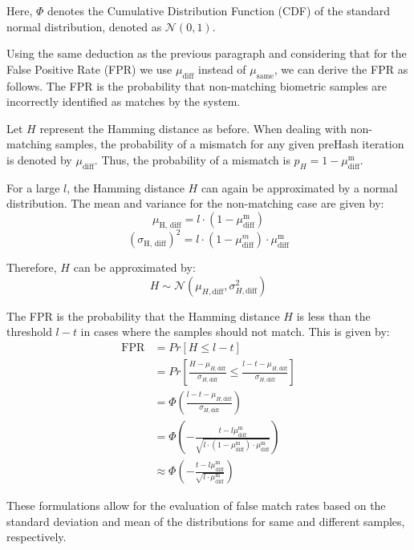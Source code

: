 Here, \(\Phi\) denotes the Cumulative Distribution Function (CDF) of the standard normal distribution, denoted as \(\mathcal{N}(0, 1)\).

Using the same deduction as the previous paragraph and considering that for the False Positive Rate (FPR) we use \(\mu_{\text{diff}}\) instead of \(\mu_{\text{same}}\), we can derive the FPR as follows. The FPR is the probability that non-matching biometric samples are incorrectly identified as matches by the system. 

Let \( H \) represent the Hamming distance as before. When dealing with non-matching samples, the probability of a mismatch for any given preHash iteration is denoted by \( \mu_{\text{diff}} \). Thus, the probability of a mismatch is \( p_H = 1 - \mu_{\text{diff}}^\text{m} \).

For a large \( l \), the Hamming distance \( H \) can again be approximated by a normal distribution. The mean and variance for the non-matching case are given by:
\[
\mu_{\text{H, diff}} = l \cdot (1 - \mu_{\text{diff}}^\text{m})
\]
\[
(\sigma_{\text{H, diff}})^2 = l \cdot (1 - \mu_{\text{diff}}^m) \cdot \mu_{\text{diff}}^\text{m}
\]

Therefore, \( H \) can be approximated by:
\[
H \sim \mathcal{N}(\mu_{H, \text{diff}}, \sigma_{H, \text{diff}}^\text{2})
\]

The FPR is the probability that the Hamming distance \( H \) is less than the threshold \( l - t \) in cases where the samples should not match. This is given by:
\begin{equation}
\begin{aligned}
    \label{eq:fpr}
    \text{FPR} &= Pr[H \leq l - t] \\
    &= Pr\left[\frac{H - \mu_{H, \text{diff}}}{\sigma_{H, \text{diff}}} \leq \frac{l - t - \mu_{H, \text{diff}}}{\sigma_{H, \text{diff}}}\right] \\
    &= \Phi\left(\frac{l - t - \mu_{H, \text{diff}}}{\sigma_{H, \text{diff}}}\right) \\
    &= \Phi\left(-\frac{t - l\mu_{\text{diff}}^\text{m}}{\sqrt{l \cdot (1 - \mu_{\text{diff}}^\text{m}) \cdot \mu_{\text{diff}}^\text{m}}}\right)\\
    &\approx\Phi\left(-\frac{t - l\mu_{\text{diff}}^\text{m}}{\sqrt{l\cdot \mu_{\text{diff}}^\text{m}}}\right)
\end{aligned}
\end{equation}

These formulations allow for the evaluation of false match rates based on the standard deviation and mean of the distributions for same and different samples, respectively.

